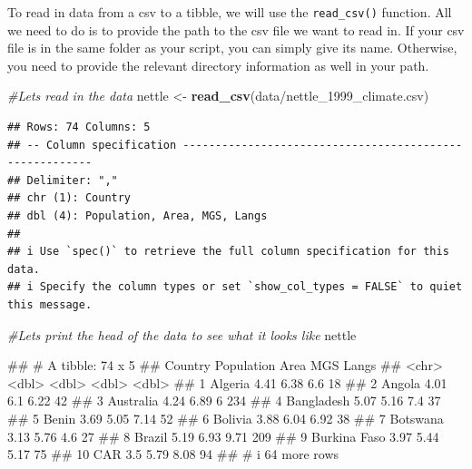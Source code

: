 \documentclass[
]{book}
\newenvironment{Shaded}{\begin{snugshade}}{\end{snugshade}}
\newcommand{\CommentTok}[1]{\textcolor[rgb]{0.56,0.35,0.01}{\textit{#1}}}
\newcommand{\FunctionTok}[1]{\textcolor[rgb]{0.13,0.29,0.53}{\textbf{#1}}}
\newcommand{\NormalTok}[1]{#1}
\newcommand{\OtherTok}[1]{\textcolor[rgb]{0.56,0.35,0.01}{#1}}
\newcommand{\StringTok}[1]{\textcolor[rgb]{0.31,0.60,0.02}{#1}}
\begin{document}
To read in data from a csv to a tibble, we will use the \texttt{read\_csv()} function. All we need to do is to provide the path to the csv file we want to read in. If your csv file is in the same folder as your script, you can simply give its name. Otherwise, you need to provide the relevant directory information as well in your path.

\begin{Shaded}
\begin{Highlighting}[]
\CommentTok{\#Let\textquotesingle{}s read in the data}
\NormalTok{nettle }\OtherTok{\textless{}{-}} \FunctionTok{read\_csv}\NormalTok{(}\StringTok{\textquotesingle{}data/nettle\_1999\_climate.csv\textquotesingle{}}\NormalTok{)}
\end{Highlighting}
\end{Shaded}

\begin{verbatim}
## Rows: 74 Columns: 5
## -- Column specification --------------------------------------------------------
## Delimiter: ","
## chr (1): Country
## dbl (4): Population, Area, MGS, Langs
## 
## i Use `spec()` to retrieve the full column specification for this data.
## i Specify the column types or set `show_col_types = FALSE` to quiet this message.
\end{verbatim}

\begin{Shaded}
\begin{Highlighting}[]
\CommentTok{\#Let\textquotesingle{}s print the head of the data to see what it looks like}
\NormalTok{nettle}
\end{Highlighting}
\end{Shaded}

\begin{Shaded}
\begin{Highlighting}[]
\NormalTok{\#\# \# A tibble: 74 x 5}
\NormalTok{\#\#    Country      Population  Area   MGS Langs}
\NormalTok{\#\#    \textless{}chr\textgreater{}             \textless{}dbl\textgreater{} \textless{}dbl\textgreater{} \textless{}dbl\textgreater{} \textless{}dbl\textgreater{}}
\NormalTok{\#\#  1 Algeria            4.41  6.38  6.6     18}
\NormalTok{\#\#  2 Angola             4.01  6.1   6.22    42}
\NormalTok{\#\#  3 Australia          4.24  6.89  6      234}
\NormalTok{\#\#  4 Bangladesh         5.07  5.16  7.4     37}
\NormalTok{\#\#  5 Benin              3.69  5.05  7.14    52}
\NormalTok{\#\#  6 Bolivia            3.88  6.04  6.92    38}
\NormalTok{\#\#  7 Botswana           3.13  5.76  4.6     27}
\NormalTok{\#\#  8 Brazil             5.19  6.93  9.71   209}
\NormalTok{\#\#  9 Burkina Faso       3.97  5.44  5.17    75}
\NormalTok{\#\# 10 CAR                3.5   5.79  8.08    94}
\NormalTok{\#\# \# i 64 more rows}
\end{Highlighting}
\end{Shaded}
\end{document}
